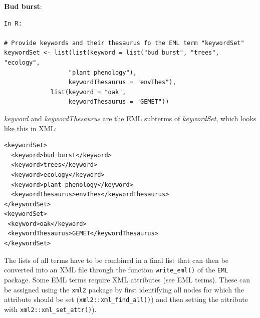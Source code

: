 \documentclass[
  oneside]{book}
\begin{document}
\begin{examplebox}

\textbf{Bud burst}:

\begin{verbatim}
In R:

# Provide keywords and their thesaurus fo the EML term "keywordSet"
keywordSet <- list(list(keyword = list("bud burst", "trees", "ecology", 
                  "plant phenology"),
                  keywordThesaurus = "envThes"),
             list(keyword = "oak",
                  keywordThesaurus = "GEMET"))
\end{verbatim}

\emph{keyword} and \emph{keywordThesaurus} are the EML subterms of \emph{keywordSet}, which looks like this in XML:

\begin{verbatim}
<keywordSet>
  <keyword>bud burst</keyword>
  <keyword>trees</keyword>
  <keyword>ecology</keyword>
  <keyword>plant phenology</keyword>
  <keywordThesaurus>envThes</keywordThesaurus>
</keywordSet>
<keywordSet>
 <keyword>oak</keyword>
 <keywordThesaurus>GEMET</keywordThesaurus>
</keywordSet>
\end{verbatim}

\end{examplebox}

The lists of all terms have to be combined in a final list that can then be converted into an XML file through the function \texttt{write\_eml()} of the \texttt{EML} package.
Some EML terms require XML attributes (see EML terms). These can be assigned using the \texttt{xml2} package by first identifying all nodes for which the attribute should be set (\texttt{xml2::xml\_find\_all()}) and then setting the attribute with \texttt{xml2::xml\_set\_attr()}).
\end{document}
